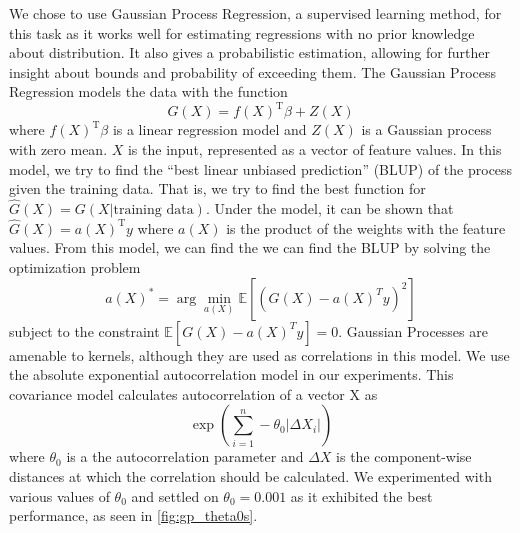 We chose to use Gaussian Process Regression, a supervised learning
method, for this task as it works well for estimating regressions with
no prior knowledge about distribution. It also gives a probabilistic
estimation, allowing for further insight about bounds and probability
of exceeding them. The Gaussian Process Regression models the data
with the function
\begin{equation*}
G(X) = f(X)^{\textrm{T}}\beta + Z(X)
\end{equation*}
where $f(X)^{\textrm{T}}\beta$ is a linear regression model and $Z(X)$
is a Gaussian process with zero mean. $X$ is the input, represented as
a vector of feature values.  In this model, we try to find the ``best
linear unbiased prediction'' (BLUP) of the process given the training
data. That is, we try to find the best function for
$\hat{G}(X) = G(X|\textrm{training data})$. Under the model, it can be
shown that $\hat{G}(X) = a(X)^{\textrm{T}}y$ where $a(X)$ is the
product of the weights with the feature values. From this model, we
can find the we can find the BLUP by solving the optimization problem
\begin{equation*}
a(X)^* = \arg \min\limits_{a(X)} \mathbb{E}[(G(X) - a(X)^T y)^2]
\end{equation*}
subject to the constraint $\mathbb{E}[G(X) - a(X)^T y] = 0$. Gaussian
Processes are amenable to kernels, although they are used as
correlations in this model. We use the absolute exponential
autocorrelation model in our experiments. This covariance model
calculates autocorrelation of a vector X as
\begin{equation*}
  \exp\left( \sum_{i = 1}^n -\theta_0 |\Delta X_i| \right)
\end{equation*}
where $\theta_0$ is a the autocorrelation parameter and $\Delta X$ is
the component-wise distances at which the correlation should be
calculated. We experimented with various values of $\theta_0$ and
settled on $\theta_0 = 0.001$ as it exhibited the best performance, as
seen in \cref{fig:gp_theta0s}.

